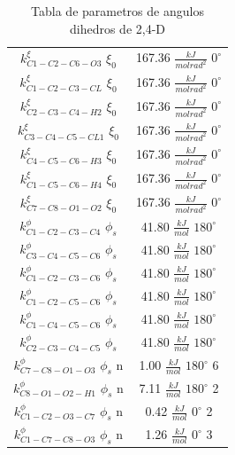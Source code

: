 \begin{table}[!h]
    \centering
    \begin{tabular}{|c|c|}
    \hline
    $k^{\xi}_{C1-C2-C6-O3}$ $\xi_{0}$ & 167.36 $\frac{kJ}{molrad^2}$ $0^{\circ}$ \\
    $k^{\xi}_{C1-C2-C3-CL}$ $\xi_{0}$ & 167.36 $\frac{kJ}{molrad^2}$ $0^{\circ}$ \\
    $k^{\xi}_{C2-C3-C4-H2}$ $\xi_{0}$ & 167.36 $\frac{kJ}{molrad^2}$ $0^{\circ}$ \\
    $k^{\xi}_{C3-C4-C5-CL1}$ $\xi_{0}$ & 167.36 $\frac{kJ}{molrad^2}$ $0^{\circ}$ \\
    $k^{\xi}_{C4-C5-C6-H3}$ $\xi_{0}$ & 167.36 $\frac{kJ}{molrad^2}$ $0^{\circ}$ \\
    $k^{\xi}_{C1-C5-C6-H4}$ $\xi_{0}$ & 167.36 $\frac{kJ}{molrad^2}$ $0^{\circ}$ \\
    $k^{\xi}_{C7-C8-O1-O2}$ $\xi_{0}$ & 167.36 $\frac{kJ}{molrad^2}$ $0^{\circ}$ \\
    
    $k^{\phi}_{C1-C2-C3-C4}$ $\phi_s$ & 41.80 $\frac{kJ}{mol}$ $180^{\circ}$\\
    $k^{\phi}_{C3-C4-C5-C6}$ $\phi_s$ & 41.80 $\frac{kJ}{mol}$ $180^{\circ}$\\
    $k^{\phi}_{C1-C2-C3-C6}$ $\phi_s$ & 41.80 $\frac{kJ}{mol}$ $180^{\circ}$\\
    $k^{\phi}_{C1-C2-C5-C6}$ $\phi_s$ & 41.80 $\frac{kJ}{mol}$ $180^{\circ}$\\
    $k^{\phi}_{C1-C4-C5-C6}$ $\phi_s$ & 41.80 $\frac{kJ}{mol}$ $180^{\circ}$\\
    $k^{\phi}_{C2-C3-C4-C5}$ $\phi_s$ & 41.80 $\frac{kJ}{mol}$ $180^{\circ}$\\
    $k^{\phi}_{C7-C8-O1-O3}$ $\phi_s$ n & 1.00 $\frac{kJ}{mol}$ $180^{\circ}$ 6\\
    $k^{\phi}_{C8-O1-O2-H1}$ $\phi_s$ n & 7.11 $\frac{kJ}{mol}$ $180^{\circ}$ 2\\
    $k^{\phi}_{C1-C2-O3-C7}$ $\phi_s$ n & 0.42 $\frac{kJ}{mol}$ $0^{\circ}$ 2\\
    $k^{\phi}_{C1-C7-C8-O3}$ $\phi_s$ n & 1.26 $\frac{kJ}{mol}$ $0^{\circ}$ 3\\
    \hline
    \end{tabular}
    \caption{Tabla de parametros de angulos dihedros de 2,4-D}
    \label{tab:angulosdih24D}
\end{table}

